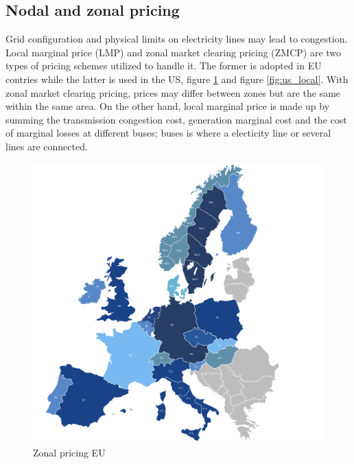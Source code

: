 \subsection{Nodal and zonal pricing}
Grid configuration and physical limits on electricity lines may lead to congestion. Local marginal price (LMP) and zonal market clearing pricing (ZMCP) are two types of pricing schemes utilized to handle it. The former is adopted in EU contries while the latter is used in the US, figure \ref{fig:eu_zonal} and figure \ref{fig:us_local}.
With zonal market clearing pricing, prices may differ between zones but are the same within the same area.
On the other hand, local marginal price is made up by summing the transmission congestion cost, generation marginal cost and the cost of marginal losses at different buses; buses is where a electicity line or several lines are connected.
\begin{figure}[!h]
    \includegraphics[width=\textwidth]{images/eu_zonal.png}
    \caption{Zonal pricing EU \cite{eu_zonal}}
    \label{fig:eu_zonal}
\end{figure}

